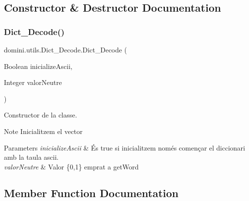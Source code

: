 \subsection{Constructor \& Destructor Documentation}
\mbox{\label{classdomini_1_1utils_1_1Dict__Decode_a8a0f9e67c530bafc031e72c218ce74f8}} 
\subsubsection{\texorpdfstring{Dict\+\_\+\+Decode()}{Dict\_Decode()}}
{\footnotesize\ttfamily domini.\+utils.\+Dict\+\_\+\+Decode.\+Dict\+\_\+\+Decode (\begin{DoxyParamCaption}\item[{Boolean}]{inicialize\+Ascii,  }\item[{Integer}]{valor\+Neutre }\end{DoxyParamCaption})\hspace{0.3cm}{\ttfamily [inline]}}



Constructor de la classe. 

\begin{DoxyNote}{Note}
Inicialitzem el vector 
\end{DoxyNote}

\begin{DoxyParams}{Parameters}
{\em inicialize\+Ascii} & És true si inicialitzem només començar el diccionari amb la taula ascii. \\
\hline
{\em valor\+Neutre} & Valor \{0,1\} emprat a get\+Word \\
\hline
\end{DoxyParams}


\subsection{Member Function Documentation}
\mbox{\label{classdomini_1_1utils_1_1Dict__Decode_a077011e4507db308d143ea9b7146abb9}} 
